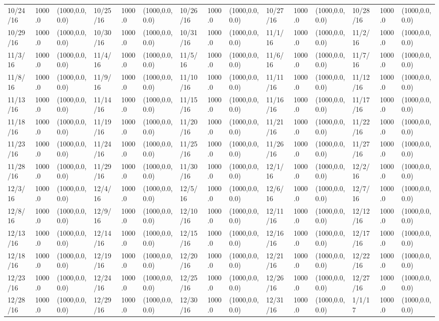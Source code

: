 \documentclass[12pt]{article}
\begin{document}
\begin{table}
\begin{center}
\begin{tabular}{p{15pt}p{15pt}p{25pt}p{15pt}p{15pt}p{25pt}p{15pt}p{15pt}p{25pt}p{15pt}p{15pt}p{25pt}p{15pt}p{15pt}p{25pt}}
    10/24/16&1000.0&(1000,0.0,0.0)&10/25/16&1000.0&(1000,0.0,0.0)&10/26/16&1000.0&(1000,0.0,0.0)&10/27/16&1000.0&(1000,0.0,0.0)&10/28/16&1000.0&(1000,0.0,0.0)\\
    10/29/16&1000.0&(1000,0.0,0.0)&10/30/16&1000.0&(1000,0.0,0.0)&10/31/16&1000.0&(1000,0.0,0.0)&11/1/16&1000.0&(1000,0.0,0.0)&11/2/16&1000.0&(1000,0.0,0.0)\\
    11/3/16&1000.0&(1000,0.0,0.0)&11/4/16&1000.0&(1000,0.0,0.0)&11/5/16&1000.0&(1000,0.0,0.0)&11/6/16&1000.0&(1000,0.0,0.0)&11/7/16&1000.0&(1000,0.0,0.0)\\
    11/8/16&1000.0&(1000,0.0,0.0)&11/9/16&1000.0&(1000,0.0,0.0)&11/10/16&1000.0&(1000,0.0,0.0)&11/11/16&1000.0&(1000,0.0,0.0)&11/12/16&1000.0&(1000,0.0,0.0)\\
    11/13/16&1000.0&(1000,0.0,0.0)&11/14/16&1000.0&(1000,0.0,0.0)&11/15/16&1000.0&(1000,0.0,0.0)&11/16/16&1000.0&(1000,0.0,0.0)&11/17/16&1000.0&(1000,0.0,0.0)\\
    11/18/16&1000.0&(1000,0.0,0.0)&11/19/16&1000.0&(1000,0.0,0.0)&11/20/16&1000.0&(1000,0.0,0.0)&11/21/16&1000.0&(1000,0.0,0.0)&11/22/16&1000.0&(1000,0.0,0.0)\\
    11/23/16&1000.0&(1000,0.0,0.0)&11/24/16&1000.0&(1000,0.0,0.0)&11/25/16&1000.0&(1000,0.0,0.0)&11/26/16&1000.0&(1000,0.0,0.0)&11/27/16&1000.0&(1000,0.0,0.0)\\
    11/28/16&1000.0&(1000,0.0,0.0)&11/29/16&1000.0&(1000,0.0,0.0)&11/30/16&1000.0&(1000,0.0,0.0)&12/1/16&1000.0&(1000,0.0,0.0)&12/2/16&1000.0&(1000,0.0,0.0)\\
    12/3/16&1000.0&(1000,0.0,0.0)&12/4/16&1000.0&(1000,0.0,0.0)&12/5/16&1000.0&(1000,0.0,0.0)&12/6/16&1000.0&(1000,0.0,0.0)&12/7/16&1000.0&(1000,0.0,0.0)\\
    12/8/16&1000.0&(1000,0.0,0.0)&12/9/16&1000.0&(1000,0.0,0.0)&12/10/16&1000.0&(1000,0.0,0.0)&12/11/16&1000.0&(1000,0.0,0.0)&12/12/16&1000.0&(1000,0.0,0.0)\\
    12/13/16&1000.0&(1000,0.0,0.0)&12/14/16&1000.0&(1000,0.0,0.0)&12/15/16&1000.0&(1000,0.0,0.0)&12/16/16&1000.0&(1000,0.0,0.0)&12/17/16&1000.0&(1000,0.0,0.0)\\
    12/18/16&1000.0&(1000,0.0,0.0)&12/19/16&1000.0&(1000,0.0,0.0)&12/20/16&1000.0&(1000,0.0,0.0)&12/21/16&1000.0&(1000,0.0,0.0)&12/22/16&1000.0&(1000,0.0,0.0)\\
    12/23/16&1000.0&(1000,0.0,0.0)&12/24/16&1000.0&(1000,0.0,0.0)&12/25/16&1000.0&(1000,0.0,0.0)&12/26/16&1000.0&(1000,0.0,0.0)&12/27/16&1000.0&(1000,0.0,0.0)\\
    12/28/16&1000.0&(1000,0.0,0.0)&12/29/16&1000.0&(1000,0.0,0.0)&12/30/16&1000.0&(1000,0.0,0.0)&12/31/16&1000.0&(1000,0.0,0.0)&1/1/17&1000.0&(1000,0.0,0.0)\\

\end{tabular}
\end{center}
\end{table}
\end{document}
